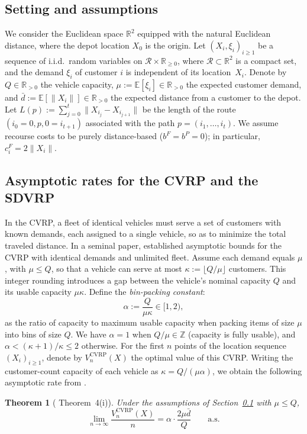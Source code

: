 \documentclass{article}
\newtheorem{theorem}{Theorem}
\begin{document}
{\subsection{Setting and assumptions}\label{sec:asymptotics:setting}
We consider the Euclidean space $\mathbb{R}^2$ equipped with the natural Euclidean distance, where the depot location $X_0$ is the origin. Let $(X_i, \xi_i)_{i \geq 1}$ be a sequence of i.i.d.\ random variables on $\mathcal{R} \times \mathbb{R}_{\geq 0}$, where $\mathcal{R} \subset \mathbb{R}^2$ is a compact set, and the demand $\xi_i$ of customer $i$ is independent of its location~$X_i$. Denote by $Q\in \mathbb{R}_{>0}$ the vehicle capacity, $\mu := \mathbb{E}[\xi_i]\in \mathbb{R}_{>0}$ the expected customer demand, and $\bar{d} := \mathbb{E}[\|X_i\|]\in \mathbb{R}_{>0}$ the expected distance from a customer to the depot. Let $L(p) := \sum_{j=0}^{t} \|X_{i_j} - X_{i_{j+1}}\|$ be the length of the route $(i_0{=}0, p, 0{=}i_{t+1})$ associated with the path $p = (i_1, \ldots, i_t)$. We assume recourse costs to be purely distance-based ($b^F = b^P = 0$); in particular, $c^F_i=2\|X_i\|$. 

\subsection{Asymptotic rates for the CVRP and the SDVRP}\label{sec:asymptotics:sdvrp}

In the CVRP, a fleet of identical vehicles must serve a set of customers with known demands, each assigned to a single vehicle, so as to minimize the total traveled distance. In a seminal paper, \cite{haimovich1985bounds} established asymptotic bounds for the CVRP with identical demands and unlimited fleet. Assume each demand equals $\mu$, with $\mu \leq Q$, so that a vehicle can serve at most $\kappa := \lfloor Q/\mu \rfloor$ customers. This integer rounding introduces a gap between the vehicle's nominal capacity $Q$ and its usable capacity $\mu\kappa$. Define the \emph{bin-packing constant}:
\begin{equation}\label{eq:alpha_def}
    \alpha := \frac{Q}{\mu\kappa} \in [1, 2),
\end{equation}
as the ratio of capacity to maximum usable capacity when packing items of size $\mu$ into bins of size $Q$. We have $\alpha = 1$ when $Q/\mu \in \mathbb{Z}$ (capacity is fully usable), and $\alpha < (\kappa + 1)/\kappa \leq 2$ otherwise. For the first $n$ points of the location sequence $(X_i)_{i \geq 1}$, denote by $V_n^{\text{CVRP}}(X)$ the optimal value of this CVRP. Writing the customer-count capacity of each vehicle as $\kappa = Q/(\mu\alpha)$, we obtain the following asymptotic rate from \cite{haimovich1985bounds}.
\begin{theorem}[\cite{haimovich1985bounds} Theorem~4(i)]\label{thm:haimovich_cvrp}
    Under the assumptions of Section~\ref{sec:asymptotics:setting} with $\mu \leq Q$,
    \begin{equation}\label{eq:unsplit_rate}
        \lim_{n \to \infty} \frac{V_n^{\text{CVRP}}(X)}{n} = \alpha \cdot \frac{2\mu\bar d}{Q} \qquad \text{a.s.}
    \end{equation}
\end{theorem}

}
\end{document}
